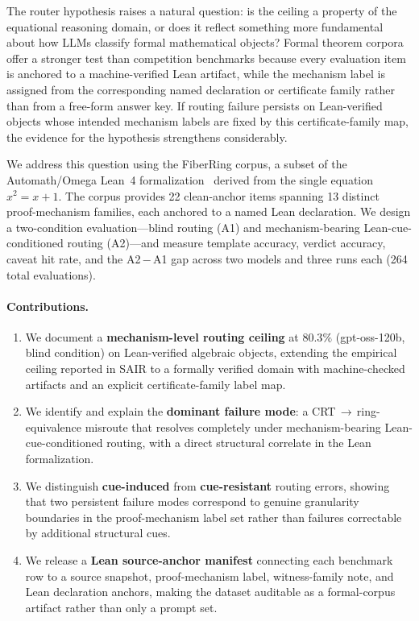 \documentclass[11pt]{article}
\begin{document}
The router hypothesis raises a natural question: is the ceiling a property
of the equational reasoning domain, or does it reflect something more
fundamental about how LLMs classify formal mathematical objects?
Formal theorem corpora offer a stronger test than competition benchmarks
because every evaluation item is anchored to a machine-verified Lean artifact,
while the mechanism label is assigned from the corresponding named declaration
or certificate family rather than from a free-form answer key.
If routing failure persists on Lean-verified objects whose intended mechanism
labels are fixed by this certificate-family map, the evidence for the
hypothesis strengthens considerably.

We address this question using the FiberRing corpus, a subset of the
Automath/Omega Lean~4 formalization~\citep{omega2026automath} derived from
the single equation $x^2 = x + 1$.
The corpus provides 22 clean-anchor items spanning 13 distinct
proof-mechanism families, each anchored to a named Lean declaration.
We design a two-condition evaluation---blind routing (A1) and
mechanism-bearing Lean-cue-conditioned routing (A2)---and measure template accuracy,
verdict accuracy, caveat hit rate, and the A2\,$-$\,A1 gap across two
models and three runs each (264 total evaluations).

\paragraph{Contributions.}
\begin{enumerate}
  \item We document a \textbf{mechanism-level routing ceiling} at $80.3\%$
        (gpt-oss-120b, blind condition) on Lean-verified algebraic objects,
        extending the empirical ceiling reported in SAIR to a formally
        verified domain with machine-checked artifacts and an explicit
        certificate-family label map.

  \item We identify and explain the \textbf{dominant failure mode}:
        a CRT\,$\to$\,ring-equivalence misroute that resolves completely
        under mechanism-bearing Lean-cue-conditioned routing, with a direct structural correlate
        in the Lean formalization.

  \item We distinguish \textbf{cue-induced} from \textbf{cue-resistant}
        routing errors, showing that two persistent failure modes correspond
        to genuine granularity boundaries in the proof-mechanism label set
        rather than failures correctable by additional structural cues.

  \item We release a \textbf{Lean source-anchor manifest} connecting each
        benchmark row to a source snapshot, proof-mechanism label,
        witness-family note, and Lean declaration anchors, making the dataset
        auditable as a formal-corpus artifact rather than only a prompt set.
\end{enumerate}
\end{document}
